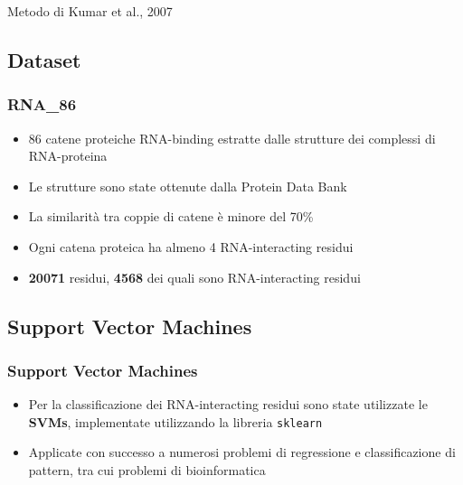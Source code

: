 \documentclass{beamer}
\begin{document}
\begin{section}{Metodo di Kumar et al., 2007}
\subsection{Dataset}
\begin{frame}
\frametitle{RNA\_86}
\begin{itemize}
\item 86 catene proteiche RNA-binding estratte dalle strutture dei complessi di RNA-proteina
\item Le strutture sono state ottenute dalla Protein Data Bank
\item La similarit\`{a} tra coppie di catene \`{e} minore del 70\%
\item Ogni catena proteica ha almeno 4 RNA-interacting residui
\item \textbf{20071} residui, \textbf{4568} dei quali sono RNA-interacting residui
\end{itemize}
\end{frame}

\subsection{Support Vector Machines}
\begin{frame}
\frametitle{Support Vector Machines}
\begin{itemize}
\item Per la classificazione dei RNA-interacting residui sono state utilizzate le \textbf{SVMs}, implementate utilizzando la libreria \texttt{sklearn}
\item Applicate con successo a numerosi problemi di regressione e classificazione di pattern, tra cui problemi di bioinformatica
\end{itemize}
\end{frame}


\end{section}
\end{document}
